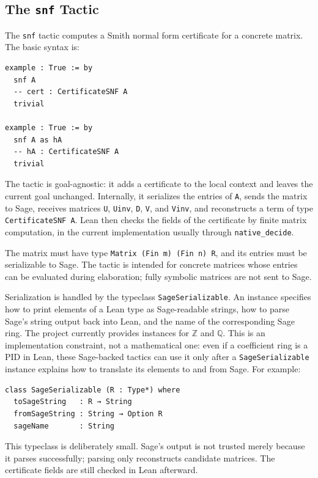 \documentclass[11pt]{article}
\theoremstyle{plain}
\theoremstyle{definition}
\theoremstyle{remark}
\newcommand{\lean}[1]{\lstinline[language=lean]|#1|}
\begin{document}
\subsection{The \texttt{snf} Tactic}

The \lean{snf} tactic computes a Smith normal form certificate for a concrete
matrix. The basic syntax is:

\begin{lstlisting}[caption={Using the \texttt{snf} tactic.},label={lst:snf-tactic}]
example : True := by
  snf A
  -- cert : CertificateSNF A
  trivial

example : True := by
  snf A as hA
  -- hA : CertificateSNF A
  trivial
\end{lstlisting}

The tactic is goal-agnostic: it adds a certificate to the local context and
leaves the current goal unchanged. Internally, it serializes the entries of
\lean{A}, sends the matrix to Sage, receives matrices \lean{U}, \lean{Uinv},
\lean{D}, \lean{V}, and \lean{Vinv}, and reconstructs a term of type
\lean{CertificateSNF A}. Lean then checks the fields of the certificate by
finite matrix computation, in the current implementation usually through
\lean{native_decide}.

The matrix must have type \lean{Matrix (Fin m) (Fin n) R}, and its entries must
be serializable to Sage. The tactic is intended for concrete matrices whose
entries can be evaluated during elaboration; fully symbolic matrices are not
sent to Sage.

Serialization is handled by the typeclass \lean{SageSerializable}. An instance
specifies how to print elements of a Lean type as Sage-readable strings, how to
parse Sage's string output back into Lean, and the name of the corresponding
Sage ring. The project currently provides instances for \(\mathbb{Z}\) and
\(\mathbb{Q}\). This is an implementation constraint, not a mathematical one:
even if a coefficient ring is a PID in Lean, these Sage-backed tactics can use
it only after a \lean{SageSerializable} instance explains how to translate its
elements to and from Sage. For example:

\begin{lstlisting}[caption={The serialization interface for coefficient rings.},label={lst:sage-serializable}]
class SageSerializable (R : Type*) where
  toSageString   : R → String
  fromSageString : String → Option R
  sageName       : String
\end{lstlisting}

This typeclass is deliberately small. Sage's output is not trusted merely
because it parses successfully; parsing only reconstructs candidate matrices.
The certificate fields are still checked in Lean afterward.
\end{document}
